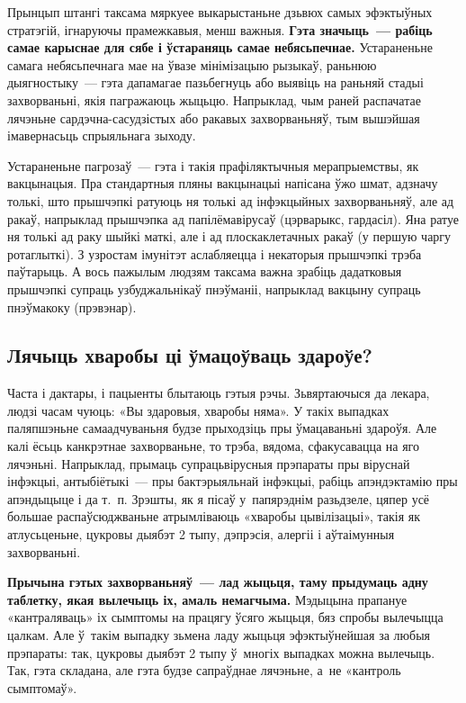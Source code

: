 Прынцып штангі таксама мяркуее выкарыстаньне дзьвюх самых эфэктыўных стратэгій, ігнаруючы прамежкавыя, менш важныя. \textbf{Гэта значыць~--- рабіць самае карыснае для сябе і ўстараняць самае небясьпечнае.} Устараненьне самага небясьпечнага мае на ўвазе мінімізацыю рызыкаў, раньнюю дыягностыку~--- гэта дапамагае пазьбегнуць або выявіць на раньняй стадыі захворваньні, якія пагражаюць жыцьцю. Напрыклад, чым раней распачатае лячэньне сардэчна-сасудзістых або ракавых захворваньняў, тым вышэйшая імавернасьць спрыяльнага зыходу.

Устараненьне пагрозаў~--- гэта і такія прафіляктычныя мерапрыемствы, як вакцынацыя. Пра стандартныя пляны вакцынацыі напісана ўжо шмат, адзначу толькі, што прышчэпкі ратуюць ня толькі ад інфэкцыйных захворваньняў, але ад ракаў, напрыклад прышчэпка ад папілёмавірусаў (цэрварыкс, гардасіл). Яна ратуе ня толькі ад раку шыйкі маткі, але і ад плоскаклетачных ракаў (у першую чаргу ротаглыткі). З узростам імунітэт аслабляецца і некаторыя прышчэпкі трэба паўтарыць. А вось пажылым людзям таксама важна зрабіць дадатковыя прышчэпкі супраць узбуджальнікаў пнэўманіі, напрыклад вакцыну супраць пнэўмакоку (прэвэнар).

\subsection*{Лячыць хваробы ці ўмацоўваць здароўе?}

Часта і дактары, і пацыенты блытаюць гэтыя рэчы. Зьвяртаючыся да лекара, людзі часам чуюць: «Вы здаровыя, хваробы няма». У такіх выпадках паляпшэньне самаадчуваньня будзе прыходзіць пры ўмацаваньні здароўя. Але калі ёсьць канкрэтнае захворваньне, то трэба, вядома, сфакусавацца на яго лячэньні. Напрыклад, прымаць супрацьвірусныя прэпараты пры віруснай інфэкцыі, антыбіётыкі~--- пры бактэрыяльнай інфэкцыі, рабіць апэндэктамію пры апэндыцыце і да т.~п. Зрэшты, як я пісаў у~папярэднім разьдзеле, цяпер усё большае распаўсюджваньне атрымліваюць «хваробы цывілізацыі», такія як атлусьценьне, цукровы дыябэт 2 тыпу, дэпрэсія, алергіі і аўтаімунныя захворваньні. 

\textbf{Прычына гэтых захворваньняў~--- лад жыцьця, таму прыдумаць адну таблетку, якая вылечыць іх, амаль немагчыма.} Мэдыцына прапануе «кантраляваць» іх сымптомы на працягу ўсяго жыцьця, бяз спробы вылечыцца цалкам. Але ў~такім выпадку зьмена ладу жыцьця эфэктыўнейшая за любыя прэпараты: так, цукровы дыябэт 2 тыпу ў~многіх выпадках можна вылечыць. Так, гэта складана, але гэта будзе сапраўднае лячэньне, а~не «кантроль сымптомаў».

